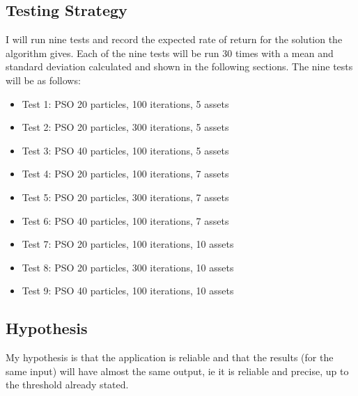     \subsection{Testing Strategy} %
    \label{sub:testing_strategy}
      I will run nine tests and record the expected rate of return for the solution the algorithm gives. Each of the nine tests will be run 30 times with a mean and standard deviation calculated and shown in the following sections. The nine tests will be as follows:
        \begin{itemize}
          \item Test 1: PSO 20 particles, 100 iterations, 5 assets
          \item Test 2: PSO 20 particles, 300 iterations, 5 assets
          \item Test 3: PSO 40 particles, 100 iterations, 5 assets
          \item Test 4: PSO 20 particles, 100 iterations, 7 assets
          \item Test 5: PSO 20 particles, 300 iterations, 7 assets
          \item Test 6: PSO 40 particles, 100 iterations, 7 assets
          \item Test 7: PSO 20 particles, 100 iterations, 10 assets
          \item Test 8: PSO 20 particles, 300 iterations, 10 assets
          \item Test 9: PSO 40 particles, 100 iterations, 10 assets
        \end{itemize}

    \subsection{Hypothesis} %
    \label{sub:hypothesis}
      My hypothesis is that the application is reliable and that the results (for the same input) will have almost the same output, ie it is reliable and precise, up to the threshold already stated. 

